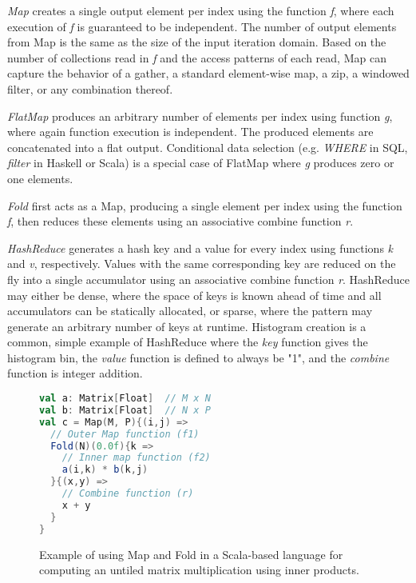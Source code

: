 \emph{Map} creates a single output element per index using the function \emph{f}, where each execution of \emph{f} is guaranteed to be independent.
The number of output elements from Map is the same as the size of the input iteration domain.
Based on the number of collections read in \emph{f} and the access patterns of each read, Map can capture the behavior of a gather, a standard element-wise map, a zip, a windowed filter, or any combination thereof.

\emph{FlatMap} produces an arbitrary number of elements per index using function \emph{g}, where again function execution is independent. The produced elements are concatenated into a flat output. Conditional data selection (e.g. \emph{WHERE} in SQL, \emph{filter} in Haskell or Scala) is a special case of FlatMap where \emph{g} produces zero or one elements.

\emph{Fold} first acts as a Map, producing a single element per index using the function \emph{f}, then reduces these elements using an associative combine function \emph{r}.

\emph{HashReduce} generates a hash key and a value for every index using functions \emph{k} and \emph{v}, respectively. Values with the same corresponding key are reduced on the fly into a single accumulator using an associative combine function \emph{r}. HashReduce may either be dense, where the space of keys is known ahead of time and all accumulators can be statically allocated, or sparse, where the pattern may generate an arbitrary number of keys at runtime. Histogram creation is a common, simple example of HashReduce where the \emph{key} function gives the histogram bin, the \emph{value} function is defined to always be "1", and the \emph{combine} function is integer addition.

\begin{figure}\centering
\begin{lstlisting}[language=Scala]
val a: Matrix[Float]  // M x N
val b: Matrix[Float]  // N x P
val c = Map(M, P){(i,j) =>
  // Outer Map function (f1)
  Fold(N)(0.0f){k =>
    // Inner map function (f2)
    a(i,k) * b(k,j)
  }{(x,y) =>
    // Combine function (r)
    x + y
  }
}
\end{lstlisting}
\vspace{-10pt}
\caption{Example of using Map and Fold in a Scala-based language for computing an untiled matrix multiplication using inner products. }
\label{fig:matmult}
\end{figure}


